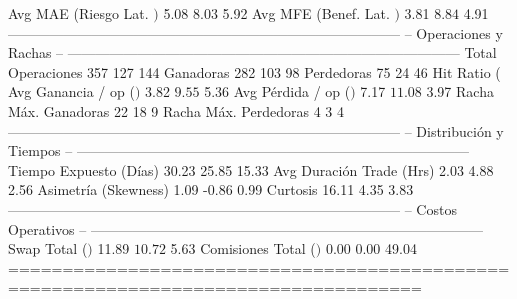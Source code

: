   Avg MAE (Riesgo Lat. $)     $           5.08  $           8.03  $           5.92
  Avg MFE (Benef. Lat. $)     $           3.81  $           8.84  $           4.91
------------------------------------------------------------------------------------
  -- Operaciones y Rachas --
------------------------------------------------------------------------------------
  Total Operaciones                        357               127               144
  Ganadoras                                282               103                98
  Perdedoras                                75                24                46
  Hit Ratio (%
  Avg Ganancia / op ($)       $           3.82  $           9.55  $           5.36
  Avg Pérdida / op ($)        $           7.17  $          11.08  $           3.97
  Racha Máx. Ganadoras                      22                18                 9
  Racha Máx. Perdedoras                      4                 3                 4
------------------------------------------------------------------------------------
  -- Distribución y Tiempos --
------------------------------------------------------------------------------------
  Tiempo Expuesto (Días)                 30.23             25.85             15.33
  Avg Duración Trade (Hrs)                2.03              4.88              2.56
  Asimetría (Skewness)                    1.09             -0.86              0.99
  Curtosis                               16.11              4.35              3.83
------------------------------------------------------------------------------------
  -- Costos Operativos --
------------------------------------------------------------------------------------
  Swap Total ($)              $          11.89  $          10.72  $           5.63
  Comisiones Total ($)        $           0.00  $           0.00  $          49.04
====================================================================================

